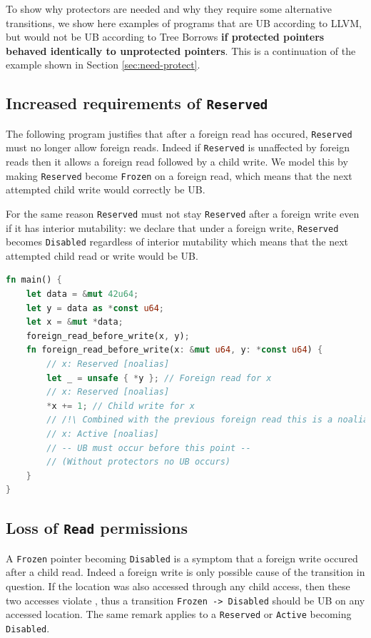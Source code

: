 \documentclass[a4paper,11pt]{article}
\theoremstyle{plain}
\theoremstyle{definition}
\theoremstyle{remark}
\newcommand{\tcode}[1]{\rstinline{#1}}
\newcommand{\tperm}[1]{\texttt{#1}}
\begin{document}
To show why protectors are needed and why they require some alternative
transitions, we show here examples of programs that are UB according to LLVM,
but would not be UB according to Tree Borrows \textbf{if protected pointers behaved identically to unprotected pointers}.
This is a continuation of the example shown in Section \ref{sec:need-protect}.

\subsection{Increased requirements of \tperm{Reserved}}

The following program justifies that after a foreign read has occured, \tperm{Reserved} must no longer allow
foreign reads. Indeed if \tperm{Reserved} is unaffected by foreign reads then it allows a foreign read
followed by a child write. We model this by making \tperm{Reserved} become \tperm{Frozen} on a foreign read,
which means that the next attempted child write would correctly be UB.

For the same reason \tperm{Reserved} must not stay \tperm{Reserved} after a foreign write even
if it has interior mutability: we declare that under a foreign write, \tperm{Reserved} becomes
\tperm{Disabled} regardless of interior mutability which means that the next attempted child read or write would be UB.

\begin{lstlisting}[language=rust]
fn main() {
    let data = &mut 42u64;
    let y = data as *const u64;
    let x = &mut *data;
    foreign_read_before_write(x, y);
    fn foreign_read_before_write(x: &mut u64, y: *const u64) {
        // x: Reserved [noalias]
        let _ = unsafe { *y }; // Foreign read for x
        // x: Reserved [noalias]
        *x += 1; // Child write for x
        // /!\ Combined with the previous foreign read this is a noalias violation
        // x: Active [noalias]
        // -- UB must occur before this point --
        // (Without protectors no UB occurs)
    }
}
\end{lstlisting}


\subsection{Loss of \tperm{Read} permissions}

A \tperm{Frozen} pointer becoming \tperm{Disabled} is a symptom that a foreign write occured after
a child read. Indeed a foreign write is only possible cause of the transition in question.
If the location was also accessed through any child access, then these two accesses violate
\tcode{noalias}, thus a transition \tperm{Frozen -> Disabled} should be UB on any accessed location.
The same remark applies to a \tperm{Reserved} or \tperm{Active} becoming \tperm{Disabled}.
\end{document}
